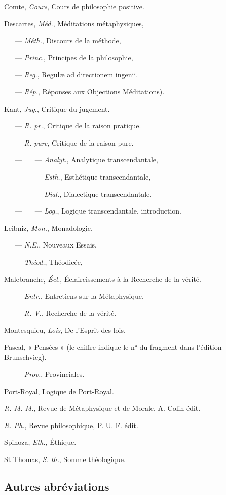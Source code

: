 Comte, {\it Cours}, Cours de philosophie positive.

Descartes, {\it Méd.}, Méditations métaphysiques,

\ \ \ — {\it Méth.}, Discours de la méthode,

\ \ \ — {\it Princ.}, Principes de la philosophie,

\ \ \ — {\it Reg.}, Regulæ ad directionem ingenii.

\ \ \ — {\it Rép.}, Réponses aux Objections Méditations).

Kant, {\it Jug.}, Critique du jugement.

\ \ \ —  {\it R. pr.}, Critique de la raison pratique.

\ \ \ — {\it R. pure}, Critique de la raison pure.

\ \ \ — \ \ \ — {\it Analyt.}, Analytique transcendantale,

\ \ \ — \ \ \ — {\it Esth.}, Esthétique transcendantale,

\ \ \ — \ \ \ — {\it Dial.}, Dialectique transcendantale.

\ \ \ — \ \ \ — {\it Log.}, Logique transcendantale, introduction.

Leibniz, {\it Mon.}, Monadologie.

\ \ \ —  {\it N.E.}, Nouveaux Essais,

\ \ \ — {\it Théod.}, Théodicée,

Malebranche, {\it Écl.}, Éclaircissements à la Recherche de la vérité.

\ \ \ — {\it Entr.}, Entretiens sur la Métaphysique.

\ \ \ — {\it R. V.}, Recherche de la vérité.

Montesquieu, {\it Lois}, De l'Esprit des lois.

Pascal, « Pensées » (le chiffre indique le n° du fragment dans l'édition Brunschvieg).

\ \ \ —  {\it Prov.}, Provinciales.

Port-Royal, Logique de Port-Royal.

{\it R. M. M.}, Revue de Métaphysique et de Morale, A. Colin édit.

{\it R. Ph.}, Revue philosophique, P. U. F. édit.

Spinoza, {\it Eth.}, Éthique.

St Thomas, {\it S. th.}, Somme théologique.

\subsection {Autres abréviations}

